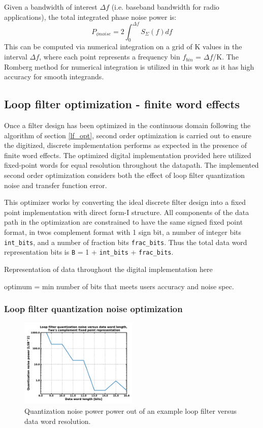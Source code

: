 	Given a bandwidth of interest $\Delta f$ (i.e. baseband bandwidth for radio applications), the total integrated phase noise power is:
	\begin{equation}
		P_{\phi noise} = 2\int_0^{\Delta f} S_{\Sigma}(f)df
	\end{equation}
	This can be computed via numerical integration on a grid of K values in the interval $\Delta f$, where each point represents a frequency bin $f_{bin}$ = $\Delta f$/K. The Romberg method for numerical integration \cite{numerical_methods_2011} is utilized in this work as it has high accuracy for smooth integrands.


\subsection{Loop filter optimization - finite word effects}
Once a filter design has been optimized in the continuous domain following the algorithm of section \ref{lf_opt}, second order optimization is carried out to ensure the digitized, discrete implementation performs as expected in the presence of finite word effects. The optimized digital implementation provided here utilized fixed-point words for equal resolution throughout the datapath. The implemented second order optimization considers both the effect of loop filter quantization noise and transfer function error.

This optimizer works by converting the ideal discrete filter design into a fixed point implementation with direct form-I structure. All components of the data path in the optimization are constrained to have the same signed fixed point format, in twos complement format with 1 sign bit, a number of integer bits \texttt{int\_bits}, and a number of fraction bits \texttt{frac\_bits}. Thus the total data word representation bits is \texttt{B} = 1 + \texttt{int\_bits} + \texttt{frac\_bits}.

Representation of data throughout the digital implementation here

optimum = min number of bits that meets users accuracy and noise spec.

\subsubsection{Loop filter quantization noise optimization}

\begin{figure}[htb!]
	\center\includegraphics[width=0.5\textwidth, angle=0]{figs/lf_quant_noise.pdf}
	\caption{Quantization noise power power out of an example loop filter versus data word resolution.}
	\label{fig:lf_quant_mse}
\end{figure}


